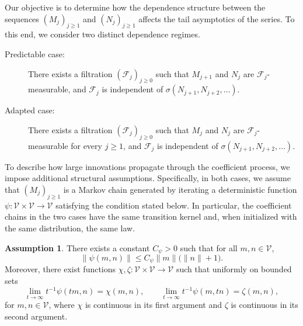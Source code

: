 \documentclass[preprint,12pt]{elsarticle}
\theoremstyle{definition}
\newtheorem{as}[thm]{Assumption}
\theoremstyle{remark}
\newcommand{\Mbf}{{ M}}
\newcommand{\Nbf}{{ N}}
\newcommand{\mbf}{{ m}}
\newcommand{\nbf}{{ n}}
\newcommand{\1}{{\mathbf 1}}
\numberwithin{equation}{section}
\newcommand{\Vcal}{\mathcal{V}}
\begin{document}
  Our objective is to determine how the dependence structure between the sequences 
  $(\Mbf_j)_{j \ge 1}$ and $(\Nbf_j)_{j \ge 1}$ affects the tail asymptotics of 
  the series. To this end, we consider two distinct dependence regimes.

  \begin{description}
    \item[Predictable case:] There exists a filtration $(\mathcal{F}_j)_{j \ge 0}$ such that 
      $\Mbf_{j+1}$ and $\Nbf_j$ are $\mathcal{F}_j$-measurable, and 
      $\mathcal{F}_j$ is independent of $\sigma(\Nbf_{j+1}, \Nbf_{j+2}, \ldots)$.

    \item[Adapted case:] There exists a filtration $(\mathcal{F}_j)_{j \ge 0}$ such that 
      $\Mbf_j$ and $\Nbf_j$ are $\mathcal{F}_j$-measurable for every $j \ge 1$, and 
      $\mathcal{F}_j$ is independent of $\sigma(\Nbf_{j+1}, \Nbf_{j+2}, \ldots)$.
  \end{description}

  To describe how large innovations propagate through the coefficient process, we impose 
  additional structural assumptions. Specifically, in both cases, we assume that 
  $(\Mbf_j)_{j \ge 1}$ is a Markov chain generated by iterating a deterministic function 
  $\psi \colon \Vcal \times \Vcal \to \Vcal$ satisfying the condition stated below. 
  In particular, the coefficient chains in the two cases have the same transition kernel 
  and, when initialized with the same distribution, the same law.
	
  \begin{as}\label{as:psi}
    There exists a constant $C_\psi > 0$ such that for all $\mbf, \nbf \in \Vcal$,
    \begin{equation}\label{sass1}
      \|\psi(\mbf, \nbf)\| \le C_{\psi} \|\mbf\| \bigl( \|\nbf\| + 1 \bigr).
    \end{equation}
    Moreover, there exist functions 
    $\chi, \zeta \colon \Vcal \times \Vcal \to \Vcal$ 
    such that uniformly on bounded sets 
    \begin{equation}\label{sass2}
      \lim_{t \to \infty} t^{-1} \psi(t \mbf, \nbf) = \chi(\mbf, \nbf),
      \qquad
      \lim_{t \to \infty} t^{-1} \psi(\mbf, t \nbf) = \zeta(\mbf, \nbf),
    \end{equation}
    for $\mbf, \nbf \in \Vcal$,
    where $\chi$ is continuous in its first argument and $\zeta$ is continuous 
    in its second argument.
  \end{as}
\end{document}
